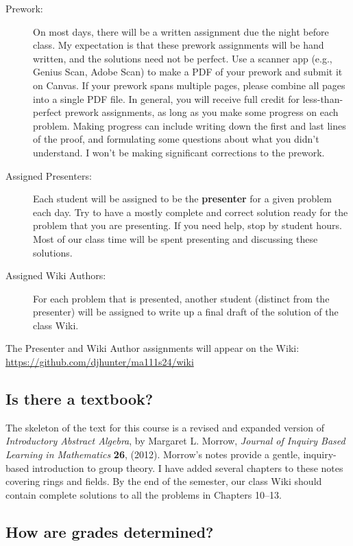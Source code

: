 \documentclass[
  twoside]{article}
\begin{document}
\begin{description}
\item[Prework:] On most days, there will be a written assignment due the night before class. My expectation is that these prework assignments will be hand written, and the solutions need not be perfect. Use a scanner app (e.g., Genius Scan, Adobe Scan) to make a PDF of your prework and submit it on Canvas. If your prework spans multiple pages, please combine all pages into a single PDF file. In general, you will receive full credit for less-than-perfect prework assignments, as long as you make some progress on each problem.  Making progress can include writing down the first and last lines of the proof, and formulating some questions about what you didn't understand. I won't be making significant corrections to the prework.
\item[Assigned Presenters:] Each student will be assigned to be the   \textbf{presenter} for a given problem each day. Try to have a mostly complete and correct solution ready for the problem that you are presenting. If you need help, stop by student hours. Most of our class time will be spent presenting and discussing these solutions.
\item[Assigned Wiki Authors:]  For each problem that is presented, another student (distinct from the presenter) will be assigned to write up a final draft of the solution of the class Wiki.
\end{description}

The Presenter and Wiki Author assignments will appear on the Wiki:
\url{https://github.com/djhunter/ma111s24/wiki}

\hypertarget{is-there-a-textbook}{%
\subsection{Is there a textbook?}\label{is-there-a-textbook}}

The skeleton of the text for this course is a revised and expanded
version of \textit{Introductory Abstract Algebra}, by Margaret L.
Morrow, \textit{Journal of Inquiry Based Learning in Mathematics}
\textbf{26}, (2012). Morrow's notes provide a gentle, inquiry-based
introduction to group theory. I have added several chapters to these
notes covering rings and fields. By the end of the semester, our class
Wiki should contain complete solutions to all the problems in Chapters
10--13.

\hypertarget{how-are-grades-determined}{%
\subsection{How are grades
determined?}\label{how-are-grades-determined}}
\end{document}
